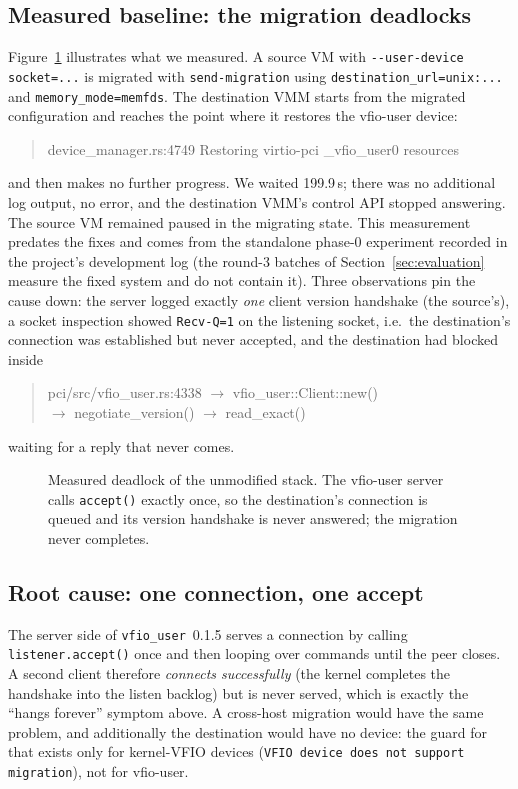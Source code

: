 \documentclass[10pt,conference]{IEEEtran}
\newcommand{\code}[1]{\texttt{#1}}
\begin{document}
\subsection{Measured baseline: the migration deadlocks}
Figure~\ref{fig:deadlock} illustrates what we measured. A source VM with
\code{-{}-user-device socket=...} is migrated with \code{send-migration} using
\code{destination\_url=unix:...} and \code{memory\_mode=memfds}. The
destination VMM starts from the migrated configuration and reaches the point
where it restores the vfio-user device:

\begin{quote}\footnotesize\ttfamily
device\_manager.rs:4749 Restoring virtio-pci \_vfio\_user0 resources
\end{quote}

\noindent and then makes no further progress. We waited 199.9\,s; there was no
additional log output, no error, and the destination VMM's control API stopped answering.
The source VM remained paused in the migrating state. This measurement predates
the fixes and comes from the standalone phase-0 experiment recorded in the
project's development log (the round-3 batches of Section~\ref{sec:evaluation}
measure the fixed system and do not contain it). Three observations pin
the cause down: the server logged exactly \emph{one} client version handshake
(the source's), a socket inspection showed \code{Recv-Q=1} on the listening
socket, i.e.\ the destination's connection was established but never accepted,
and the destination had blocked inside

\begin{quote}\footnotesize\ttfamily
pci/src/vfio\_user.rs:4338 $\rightarrow$ vfio\_user::Client::new()\\
\phantom{pci/src/vfio\_user.rs:4338 $\rightarrow$ }$\rightarrow$ negotiate\_version() $\rightarrow$ read\_exact()
\end{quote}

\noindent waiting for a reply that never comes.

\begin{figure}[t]
\centering

\caption{Measured deadlock of the unmodified stack. The vfio-user server calls
\code{accept()} exactly once, so the destination's connection is queued and its
version handshake is never answered; the migration never completes.}
\label{fig:deadlock}
\end{figure}

\subsection{Root cause: one connection, one accept}
The server side of \code{vfio\_user}~0.1.5 serves a connection by calling
\code{listener.accept()} once and then looping over commands until the peer
closes. A second client therefore \emph{connects successfully} (the kernel
completes the handshake into the listen backlog) but is never served, which is
exactly the ``hangs forever'' symptom above. A cross-host migration would have
the same problem, and additionally the destination would have no device: the
guard for that exists only for kernel-VFIO devices
(\code{VFIO device does not support migration}), not for vfio-user.
\end{document}
